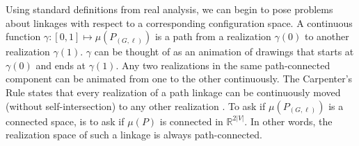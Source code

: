 \documentclass[10pt]{CSUNthesis}
\theoremstyle{plain}%
\theoremstyle{definition}
\theoremstyle{remark}
\newcommand{\bbR}{{\mathbb{R}}}
\newcommand{\lr}[1]{\left( #1 \right)}
\newcommand{\vlr}[1]{\left\vert #1 \right\vert}
\begin{document}
Using standard definitions from real analysis, we can begin to pose problems about linkages with respect to a corresponding configuration space.  
A continuous function $\gamma: [0,1]\mapsto \mu\lr{P_{(G,\ell)}}$ is a path from a realization $\gamma(0)$ to another realization $\gamma(1)$.
$\gamma$ can be thought of as an animation of drawings that starts at $\gamma(0)$ and ends at $\gamma(1)$.
Any two realizations in the same path-connected component can be animated from one to the other continuously.
The Carpenter's Rule states that every realization of a path linkage can be continuously moved (without self-intersection) to any other realization \cite{CDR03,Str05}.
To ask if $\mu\lr{P_{(G,\ell)}}$ is a connected space, is to ask if $\mu(P)$ is connected in $\bbR^{2\vert V \vert}$.
In other words, the realization space of such a linkage is always path-connected.




\end{document}
